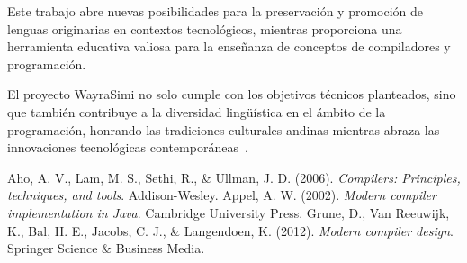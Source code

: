 \documentclass[conference]{IEEEtran}
\begin{document}
Este trabajo abre nuevas posibilidades para la preservación y promoción de lenguas originarias en contextos tecnológicos, mientras proporciona una herramienta educativa valiosa para la enseñanza de conceptos de compiladores y programación.

El proyecto WayraSimi no solo cumple con los objetivos técnicos planteados, sino que también contribuye a la diversidad lingüística en el ámbito de la programación, honrando las tradiciones culturales andinas mientras abraza las innovaciones tecnológicas contemporáneas~\cite{b2}.

\begin{thebibliography}{00}
 Aho, A. V., Lam, M. S., Sethi, R., \& Ullman, J. D. (2006). \textit{Compilers: Principles, techniques, and tools}. Addison-Wesley.
 Appel, A. W. (2002). \textit{Modern compiler implementation in Java}. Cambridge University Press.
 Grune, D., Van Reeuwijk, K., Bal, H. E., Jacobs, C. J., \& Langendoen, K. (2012). \textit{Modern compiler design}. Springer Science \& Business Media.
\end{thebibliography}
\end{document}
